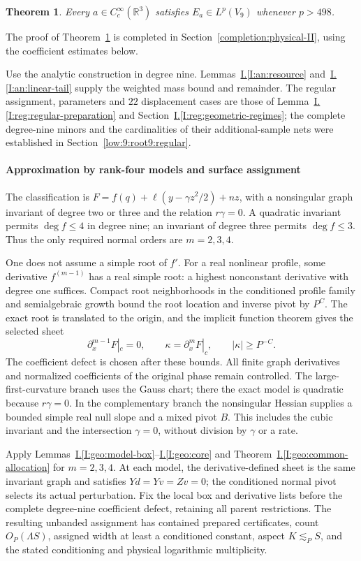 \documentclass[11pt]{amsart}
\newtheorem{theorem}{Theorem}[section]
\theoremstyle{definition}
\theoremstyle{remark}
\numberwithin{equation}{section}
\newcommand{\partIref}[1]{\hyperref[I:#1]{I.\ref*{I:#1}}}
\begin{document}
\begin{theorem}\label{low:9:root9:main}
Every $a\in C_c^\infty(\mathbb R^3)$ satisfies $E_a\in L^p(V_9)$ whenever $p>498$.
\end{theorem}

The proof of Theorem~\ref{low:9:root9:main} is completed in Section~\ref{completion:physical-II}, using the coefficient estimates below.

Use the analytic construction in degree nine. Lemmas~\partIref{an:resource} and~\partIref{an:linear-tail} supply the weighted mass bound and remainder. The regular assignment, parameters and $22$ displacement cases are those of Lemma~\partIref{reg:regular-preparation} and Section~\partIref{reg:geometric-regimes}; the complete degree-nine minors and the cardinalities of their additional-sample nets were established in Section~\ref{low:9:root9:regular}.

\paragraph{Approximation by rank-four models and surface assignment}
The classification is $F=f(q)+\ell(y-\gamma z^2/2)+nz$, with a nonsingular graph invariant of degree two or three and the relation $r\gamma=0$. A quadratic invariant permits $\deg f\le4$ in degree nine; an invariant of degree three permits $\deg f\le3$. Thus the only required normal orders are $m=2,3,4$.

One does not assume a simple root of $f'$. For a real nonlinear profile, some derivative $f^{(m-1)}$ has a real simple root: a highest nonconstant derivative with degree one suffices. Compact root neighborhoods in the conditioned profile family and semialgebraic growth bound the root location and inverse pivot by $P^C$. The exact root is translated to the origin, and the implicit function theorem gives the selected sheet
\[
\partial_x^{m-1}F|_c=0,\qquad \kappa=\partial_x^mF|_c,\qquad |\kappa|\ge P^{-C}.
\]
The coefficient defect is chosen after these bounds. All finite graph derivatives and normalized coefficients of the original phase remain controlled. The large-first-curvature branch uses the Gauss chart; there the exact model is quadratic because $r\gamma=0$. In the complementary branch the nonsingular Hessian supplies a bounded simple real null slope and a mixed pivot $B$. This includes the cubic invariant and the intersection $\gamma=0$, without division by $\gamma$ or a rate.

Apply Lemmas~\partIref{geo:model-box}--\partIref{geo:core} and Theorem~\partIref{geo:common-allocation} for $m=2,3,4$. At each model, the derivative-defined sheet is the same invariant graph and satisfies $Yd=Yv=Zv=0$; the conditioned normal pivot selects its actual perturbation. Fix the local box and derivative lists before the complete degree-nine coefficient defect, retaining all parent restrictions. The resulting unbanded assignment has contained prepared certificates, count $O_P(\Lambda S)$, assigned width at least a conditioned constant, aspect $K\lesssim_PS$, and the stated conditioning and physical logarithmic multiplicity.
\end{document}

